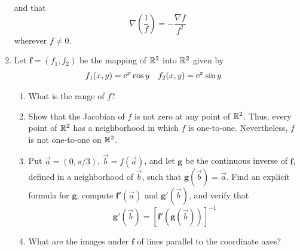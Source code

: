 \documentclass[../psets.tex]{subfiles}
\begin{document}
\begin{enumerate}[label={\textbf{\arabic*.}}]
    and that
    \begin{equation*}
        \nabla\left( \frac{1}{f} \right) = -\frac{\nabla f}{f^2}
    \end{equation*}
    wherever $f\neq 0$.
    \setcounter{enumi}{16}
    \item Let $\mathbf{f}=(f_1,f_2)$ be the mapping of $\R^2$ into $\R^2$ given by
    \begin{align*}
        f_1(x,y) &= \e[x]\cos y&
        f_2(x,y) &= \e[x]\sin y
    \end{align*}
    \begin{enumerate}
        \item What is the range of $f$?
        \item Show that the Jacobian of $f$ is not zero at any point of $\R^2$. Thus, every point of $\R^2$ has a neighborhood in which $f$ is one-to-one. Nevertheless, $f$ is not one-to-one on $\R^2$.
        \item Put $\vec{a}=(0,\pi/3)$, $\vec{b}=f(\vec{a})$, and let $\mathbf{g}$ be the continuous inverse of $\mathbf{f}$, defined in a neighborhood of $\vec{b}$, such that $\mathbf{g}(\vec{b})=\vec{a}$. Find an explicit formula for $\mathbf{g}$, compute $\mathbf{f}'(\vec{a})$ and $\mathbf{g}'(\vec{b})$, and verify that
        \begin{equation*}
            \mathbf{g}'(\vec{b}) = [\mathbf{f}'(\mathbf{g}(\vec{b}))]^{-1}
        \end{equation*}
        \item What are the images under $\mathbf{f}$ of lines parallel to the coordinate axes?
    \end{enumerate}
\end{enumerate}
\end{document}
